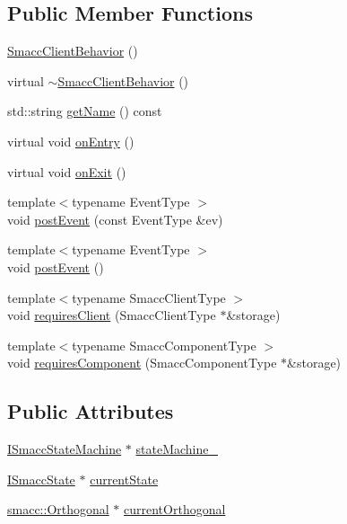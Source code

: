 \subsection*{Public Member Functions}
\begin{DoxyCompactItemize}
\item 
\hyperlink{classsmacc_1_1SmaccClientBehavior_a5fbea298db572d6c7558bfd1a65a942b}{Smacc\+Client\+Behavior} ()
\item 
virtual \hyperlink{classsmacc_1_1SmaccClientBehavior_a93dbf03b9c76a580c2de47d5bef7de0f}{$\sim$\+Smacc\+Client\+Behavior} ()
\item 
std\+::string \hyperlink{classsmacc_1_1SmaccClientBehavior_a3bdd13bc7822f75bdb64a1f23bcf9d6c}{get\+Name} () const 
\item 
virtual void \hyperlink{classsmacc_1_1SmaccClientBehavior_a7962382f93987c720ad432fef55b123f}{on\+Entry} ()
\item 
virtual void \hyperlink{classsmacc_1_1SmaccClientBehavior_ac0cd72d42bd00425362a97c9803ecce5}{on\+Exit} ()
\item 
{\footnotesize template$<$typename Event\+Type $>$ }\\void \hyperlink{classsmacc_1_1SmaccClientBehavior_ab29b23145ea074ad69340fc0af6fbb75}{post\+Event} (const Event\+Type \&ev)
\item 
{\footnotesize template$<$typename Event\+Type $>$ }\\void \hyperlink{classsmacc_1_1SmaccClientBehavior_a3152cd2215ebc0e387a8a546de07cded}{post\+Event} ()
\item 
{\footnotesize template$<$typename Smacc\+Client\+Type $>$ }\\void \hyperlink{classsmacc_1_1SmaccClientBehavior_a917f001e763a1059af337bf4e164f542}{requires\+Client} (Smacc\+Client\+Type $\ast$\&storage)
\item 
{\footnotesize template$<$typename Smacc\+Component\+Type $>$ }\\void \hyperlink{classsmacc_1_1SmaccClientBehavior_adee6abe3a28aa6b47d3dd5267e264b4d}{requires\+Component} (Smacc\+Component\+Type $\ast$\&storage)
\end{DoxyCompactItemize}
\subsection*{Public Attributes}
\begin{DoxyCompactItemize}
\item 
\hyperlink{classsmacc_1_1ISmaccStateMachine}{I\+Smacc\+State\+Machine} $\ast$ \hyperlink{classsmacc_1_1SmaccClientBehavior_a7950b5684d6de0a8e8959c0936ce9a19}{state\+Machine\+\_\+}
\item 
\hyperlink{classsmacc_1_1ISmaccState}{I\+Smacc\+State} $\ast$ \hyperlink{classsmacc_1_1SmaccClientBehavior_af76fc9b877542ed5caf033f820c107d0}{current\+State}
\item 
\hyperlink{classsmacc_1_1Orthogonal}{smacc\+::\+Orthogonal} $\ast$ \hyperlink{classsmacc_1_1SmaccClientBehavior_a642742da14ffa20e323a03eefecfc8b2}{current\+Orthogonal}
\end{DoxyCompactItemize}
